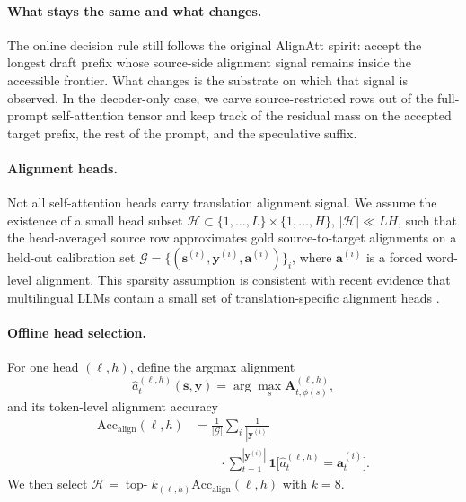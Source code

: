 \documentclass[11pt]{article}
\begin{document}
\paragraph{What stays the same and what changes.}
The online decision rule still follows the original AlignAtt spirit: accept the
longest draft prefix whose source-side alignment signal remains inside the
accessible frontier. What changes is the substrate on which that signal is
observed. In the decoder-only case, we carve source-restricted rows out of the
full-prompt self-attention tensor and keep track of the residual mass on the
accepted target prefix, the rest of the prompt, and the speculative suffix.

\paragraph{Alignment heads.}
Not all self-attention heads carry translation alignment signal. We assume the
existence of a small head subset
$\mathcal{H} \subset \{1,\ldots,L\} \times \{1,\ldots,H\}$,
$|\mathcal{H}| \ll LH$, such that the head-averaged source row approximates
gold source-to-target alignments on a held-out calibration set
$\mathcal{G} = \{(\mathbf{s}^{(i)}, \mathbf{y}^{(i)}, \mathbf{a}^{(i)})\}_i$,
where $\mathbf{a}^{(i)}$ is a forced word-level alignment. This sparsity
assumption is consistent with recent evidence that multilingual LLMs contain a
small set of translation-specific alignment heads \citep{tokenheads26}.

\paragraph{Offline head selection.}
For one head $(\ell,h)$, define the argmax alignment
\begin{equation}
  \hat{a}^{(\ell,h)}_t(\mathbf{s}, \mathbf{y})
  = \arg\max_s \mathbf{A}^{(\ell,h)}_{t,\phi(s)},
  \label{eq:head-argmax}
\end{equation}
and its token-level alignment accuracy
\begin{equation}
  \begin{aligned}
    \mathrm{Acc}_{\mathrm{align}}(\ell,h)
    &=
    \frac{1}{|\mathcal{G}|}
    \sum_i \frac{1}{|\mathbf{y}^{(i)}|} \\
    &\qquad \cdot
    \sum_{t=1}^{|\mathbf{y}^{(i)}|}
    \mathbf{1}\!\bigl[\hat{a}^{(\ell,h)}_t = \mathbf{a}^{(i)}_t\bigr].
  \end{aligned}
  \label{eq:align-acc}
\end{equation}
We then select
$\mathcal{H} = \operatorname*{top-}k_{(\ell,h)}
\mathrm{Acc}_{\mathrm{align}}(\ell,h)$ with $k=8$.
\end{document}
